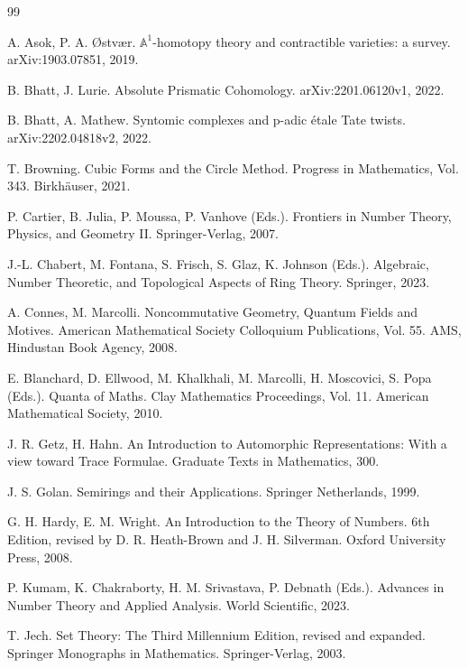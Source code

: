 \documentclass[11pt, a4paper]{article}
\theoremstyle{plain}
\theoremstyle{definition}
\numberwithin{equation}{section}
\begin{document}
\begin{thebibliography}{99}

 A. Asok, P. A. Østvær. $\mathbb{A}^1$-homotopy theory and contractible varieties: a survey. arXiv:1903.07851, 2019.

 B. Bhatt, J. Lurie. Absolute Prismatic Cohomology. arXiv:2201.06120v1, 2022.

 B. Bhatt, A. Mathew. Syntomic complexes and p-adic étale Tate twists. arXiv:2202.04818v2, 2022.

 T. Browning. Cubic Forms and the Circle Method. Progress in Mathematics, Vol. 343. Birkhäuser, 2021.

 P. Cartier, B. Julia, P. Moussa, P. Vanhove (Eds.). Frontiers in Number Theory, Physics, and Geometry II. Springer-Verlag, 2007.

 J.-L. Chabert, M. Fontana, S. Frisch, S. Glaz, K. Johnson (Eds.). Algebraic, Number Theoretic, and Topological Aspects of Ring Theory. Springer, 2023.

 A. Connes, M. Marcolli. Noncommutative Geometry, Quantum Fields and Motives. American Mathematical Society Colloquium Publications, Vol. 55. AMS, Hindustan Book Agency, 2008.

 E. Blanchard, D. Ellwood, M. Khalkhali, M. Marcolli, H. Moscovici, S. Popa (Eds.). Quanta of Maths. Clay Mathematics Proceedings, Vol. 11. American Mathematical Society, 2010.

 J. R. Getz, H. Hahn. An Introduction to Automorphic Representations: With a view toward Trace Formulae. Graduate Texts in Mathematics, 300.

 J. S. Golan. Semirings and their Applications. Springer Netherlands, 1999.

 G. H. Hardy, E. M. Wright. An Introduction to the Theory of Numbers. 6th Edition, revised by D. R. Heath-Brown and J. H. Silverman. Oxford University Press, 2008.

 P. Kumam, K. Chakraborty, H. M. Srivastava, P. Debnath (Eds.). Advances in Number Theory and Applied Analysis. World Scientific, 2023.

 T. Jech. Set Theory: The Third Millennium Edition, revised and expanded. Springer Monographs in Mathematics. Springer-Verlag, 2003.


\end{thebibliography}
\end{document}
